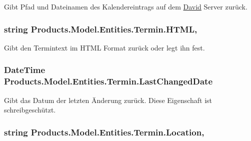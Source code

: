 Gibt Pfad und Dateinamen des Kalendereintrags auf dem \hyperlink{namespace_david}{David} Server zurück. 

\subsubsection[{\texorpdfstring{H\+T\+ML}{HTML}}]{\setlength{\rightskip}{0pt plus 5cm}string Products.\+Model.\+Entities.\+Termin.\+H\+T\+ML\hspace{0.3cm}{\ttfamily [get]}, {\ttfamily [set]}}\hypertarget{class_products_1_1_model_1_1_entities_1_1_termin_afb7e4093c42341a287616b176d7aa563}{}\label{class_products_1_1_model_1_1_entities_1_1_termin_afb7e4093c42341a287616b176d7aa563}


Gibt den Termintext im H\+T\+ML Format zurück oder legt ihn fest. 

\subsubsection[{\texorpdfstring{Last\+Changed\+Date}{LastChangedDate}}]{\setlength{\rightskip}{0pt plus 5cm}Date\+Time Products.\+Model.\+Entities.\+Termin.\+Last\+Changed\+Date\hspace{0.3cm}{\ttfamily [get]}}\hypertarget{class_products_1_1_model_1_1_entities_1_1_termin_aac86b9a1605e58e84d3af10fa0014376}{}\label{class_products_1_1_model_1_1_entities_1_1_termin_aac86b9a1605e58e84d3af10fa0014376}


Gibt das Datum der letzten Änderung zurück. Diese Eigenschaft ist schreibgeschützt. 

\subsubsection[{\texorpdfstring{Location}{Location}}]{\setlength{\rightskip}{0pt plus 5cm}string Products.\+Model.\+Entities.\+Termin.\+Location\hspace{0.3cm}{\ttfamily [get]}, {\ttfamily [set]}}\hypertarget{class_products_1_1_model_1_1_entities_1_1_termin_a91ae1fabab7673a590fb0fac439ec822}{}\label{class_products_1_1_model_1_1_entities_1_1_termin_a91ae1fabab7673a590fb0fac439ec822}



